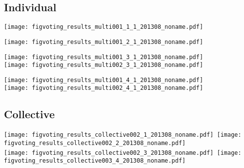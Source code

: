\subsection{Individual}

\begin{frame}[plain]
  

  \texttt{[image: figvoting\_results\_multi001\_1\_1\_201308\_noname.pdf]}\\


\begin{frame}[plain]
  

  \texttt{[image: figvoting\_results\_multi001\_2\_1\_201308\_noname.pdf]}\\


\begin{frame}[plain]
  

  \texttt{[image: figvoting\_results\_multi001\_3\_1\_201308\_noname.pdf]}\\
  \texttt{[image: figvoting\_results\_multi002\_3\_1\_201308\_noname.pdf]}


\begin{frame}[plain]
  

  \texttt{[image: figvoting\_results\_multi001\_4\_1\_201308\_noname.pdf]}\\
  \texttt{[image: figvoting\_results\_multi002\_4\_1\_201308\_noname.pdf]}


\subsection{Collective}

\begin{frame}[plain]
  

  \texttt{[image: figvoting\_results\_collective002\_1\_201308\_noname.pdf]}~\texttt{[image: figvoting\_results\_collective002\_2\_201308\_noname.pdf]}\\
  \texttt{[image: figvoting\_results\_collective002\_3\_201308\_noname.pdf]}~\texttt{[image: figvoting\_results\_collective003\_4\_201308\_noname.pdf]}




\begin{frame}[plain]
  


\end{frame}
\end{frame}
\end{frame}
\end{frame}
\end{frame}
\end{frame}
